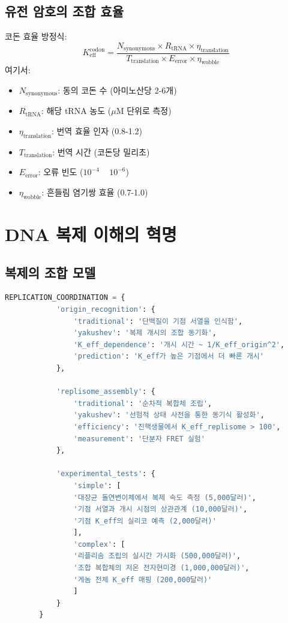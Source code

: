 \documentclass[11pt,a4paper]{article}
\begin{document}
	\subsection{유전 암호의 조합 효율}
	
	코돈 효율 방정식:
	\[
	K_{\text{eff}}^{\text{codon}} = \frac{N_{\text{synonymous}} \times R_{\text{tRNA}} \times \eta_{\text{translation}}}{T_{\text{translation}} \times E_{\text{error}} \times \eta_{\text{wobble}}}
	\]
	여기서:
	\begin{itemize}
		\item $N_{\text{synonymous}}$: 동의 코돈 수 (아미노산당 2-6개)
		\item $R_{\text{tRNA}}$: 해당 tRNA 농도 ($\mu$M 단위로 측정)
		\item $\eta_{\text{translation}}$: 번역 효율 인자 (0.8-1.2)
		\item $T_{\text{translation}}$: 번역 시간 (코돈당 밀리초)
		\item $E_{\text{error}}$: 오류 빈도 ($10^{-4}$ ~ $10^{-6}$)
		\item $\eta_{\text{wobble}}$: 흔들림 염기쌍 효율 (0.7-1.0)
	\end{itemize}
	
	\section{DNA 복제 이해의 혁명}
	
	\subsection{복제의 조합 모델}
	
	\begin{lstlisting}[language=Python, caption={동기식 조합으로서의 복제}, label={lst:rep}, breaklines=true]
		REPLICATION_COORDINATION = {
			'origin_recognition': {
				'traditional': '단백질이 기점 서열을 인식함',
				'yakushev': '복제 개시의 조합 동기화',
				'K_eff_dependence': '개시 시간 ~ 1/K_eff_origin^2',
				'prediction': 'K_eff가 높은 기점에서 더 빠른 개시'
			},
			
			'replisome_assembly': {
				'traditional': '순차적 복합체 조립',
				'yakushev': '선험적 상태 사전을 통한 동기식 활성화',
				'efficiency': '진핵생물에서 K_eff_replisome > 100',
				'measurement': '단분자 FRET 실험'
			},
			
			'experimental_tests': {
				'simple': [
				'대장균 돌연변이체에서 복제 속도 측정 (5,000달러)',
				'기점 서열과 개시 시점의 상관관계 (10,000달러)',
				'기점 K_eff의 실리코 예측 (2,000달러)'
				],
				'complex': [
				'리플리솜 조립의 실시간 가시화 (500,000달러)',
				'조합 복합체의 저온 전자현미경 (1,000,000달러)',
				'게놈 전체 K_eff 매핑 (200,000달러)'
				]
			}
		}
	\end{lstlisting}
	
\end{document}
